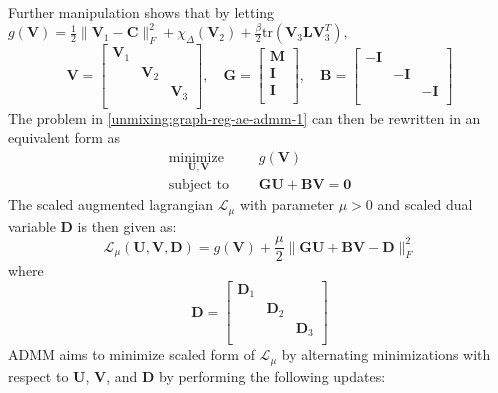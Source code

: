 Further manipulation shows that by letting
$
g(\mathbf{V}) = \frac{1}{2} \|\mathbf{V}_1 - \mathbf{C} \|_F^2 + \chi_{\Delta}(\mathbf{V}_2) + \frac{\beta}{2}\text{tr}(\mathbf{V}_3 \mathbf{L} \mathbf{V}_3^T),
$
$$
\mathbf{V} = \begin{bmatrix}
\mathbf{V}_1 &  &   \\
 &\mathbf{V}_2&   \\
  &  & \mathbf{V}_3 \\
\end{bmatrix},
\quad
\mathbf{G} = 
\begin{bmatrix}
\mathbf{M}\\ 
\mathbf{I}\\ 
\mathbf{I}\\ 
\end{bmatrix},
\quad
\mathbf{B} = 
\begin{bmatrix}
-\mathbf{I} &  &  \\
  &-\mathbf{I}&  \\
&  & -\mathbf{I} \\
\end{bmatrix}
$$
The problem in \eqref{unmixing:graph-reg-ae-admm-1} can then be rewritten in an equivalent form as
\begin{equation}
    \label{unmixing:graph-reg-ae-admm-2}
    \begin{aligned}
        \underset{\mathbf{U},\mathbf{V}}{\text{minimize }} & \quad g(\mathbf{V})
        \\         
        \text{subject to } &  \quad \mathbf{GU} + \mathbf{BV} = \mathbf{0} 
   \end{aligned}
\end{equation}
The scaled augmented lagrangian $\mathcal{L}_\mu$ with parameter $\mu > 0$ and scaled dual variable $\mathbf{D}$ is then given as:
\begin{equation}
  \label{admm:lagrangian-ae}
  \mathcal{L}_{\mu}(\mathbf{U}, \mathbf{V}, \mathbf{D}) = g(\mathbf{V}) + \frac{\mu}{2} \|\mathbf{GU} + \mathbf{BV} - \mathbf{D}\|_F^2
\end{equation}
where
$$
\mathbf{D} = 
\begin{bmatrix}
\mathbf{D}_1 &  &  \\
  &\mathbf{D}_2&  \\
&  & \mathbf{D}_3 \\
\end{bmatrix} 
$$
ADMM aims to minimize scaled form of $\mathcal{L}_{\mu}$ by alternating minimizations with respect to $\mathbf{U}$, $\mathbf{V}$, and $\mathbf{D}$ by performing the following updates:
